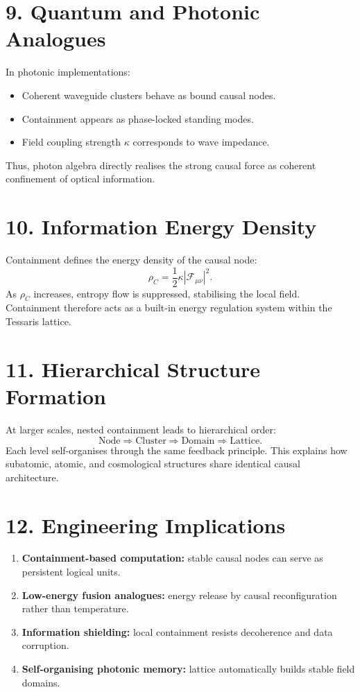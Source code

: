 \documentclass[11pt,a4paper]{article}
\begin{document}
\section{9. Quantum and Photonic Analogues}
In photonic implementations:
\begin{itemize}
\item Coherent waveguide clusters behave as bound causal nodes.
\item Containment appears as phase-locked standing modes.
\item Field coupling strength $\kappa$ corresponds to wave impedance.
\end{itemize}
Thus, photon algebra directly realises the strong causal force as coherent confinement of optical information.

\section{10. Information Energy Density}
Containment defines the energy density of the causal node:
\[
\rho_C = \frac{1}{2}\kappa |\mathcal{F}_{\mu\nu}|^2.
\]
As $\rho_C$ increases, entropy flow is suppressed, stabilising the local field.  
Containment therefore acts as a built-in energy regulation system within the Tessaris lattice.

\section{11. Hierarchical Structure Formation}
At larger scales, nested containment leads to hierarchical order:
\[
\text{Node} \Rightarrow \text{Cluster} \Rightarrow \text{Domain} \Rightarrow \text{Lattice}.
\]
Each level self-organises through the same feedback principle.  
This explains how subatomic, atomic, and cosmological structures share identical causal architecture.

\section{12. Engineering Implications}
\begin{enumerate}
\item \textbf{Containment-based computation:} stable causal nodes can serve as persistent logical units.  
\item \textbf{Low-energy fusion analogues:} energy release by causal reconfiguration rather than temperature.  
\item \textbf{Information shielding:} local containment resists decoherence and data corruption.  
\item \textbf{Self-organising photonic memory:} lattice automatically builds stable field domains.  
\end{enumerate}
\end{document}
